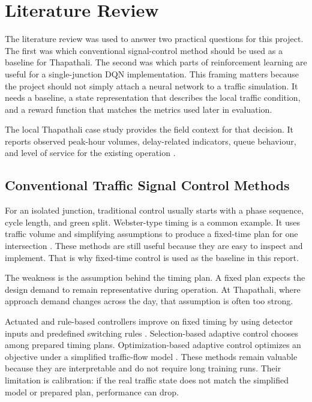 \chapter{Literature Review}
\label{chap:literature_review}

\noindent The literature review was used to answer two practical questions for
this project. The first was which conventional signal-control method
should be used as a baseline for Thapathali. The second was which parts
of reinforcement learning are useful for a single-junction DQN
implementation. This framing matters because the project should not
simply attach a neural network to a traffic simulation. It needs a
baseline, a state representation that describes the local traffic
condition, and a reward function that matches the metrics used later in
evaluation.

The local Thapathali case study provides the field context for that
decision. It reports observed peak-hour volumes, delay-related
indicators, queue behaviour, and level of service for the existing
operation \cite{maharjan2023performance}.

\section{Conventional Traffic Signal Control Methods}
\label{sec:conventional_methods}
\noindent For an isolated junction, traditional control usually starts with a
phase sequence, cycle length, and green split. Webster-type timing is a
common example. It uses traffic volume and simplifying assumptions to
produce a fixed-time plan for one intersection \cite{wei2020survey}.
These methods are still useful because they are easy to inspect and
implement. That is why fixed-time control is used as the baseline in this
report.

The weakness is the assumption behind the timing plan. A fixed plan
expects the design demand to remain representative during operation. At
Thapathali, where approach demand changes across the day, that assumption
is often too strong.

Actuated and rule-based controllers improve on fixed timing by using
detector inputs and predefined switching rules \cite{wei2020survey}.
Selection-based adaptive control chooses among prepared timing plans.
Optimization-based adaptive control optimizes an objective under a
simplified traffic-flow model \cite{wei2020survey}. These methods remain
valuable because they are interpretable and do not require long training
runs. Their limitation is calibration: if the real traffic state does not
match the simplified model or prepared plan, performance can drop.

